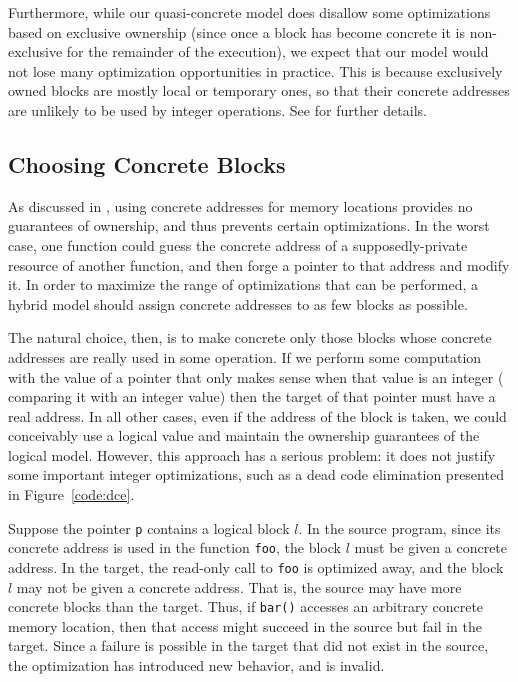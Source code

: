 Furthermore, while our quasi-concrete model does disallow some optimizations based on exclusive ownership (since once a block has become concrete it is non-exclusive for the remainder of the execution), we expect that our model would not lose many optimization
opportunities in practice. This is because exclusively owned blocks are mostly local or temporary ones,
  so that their concrete addresses are unlikely to be used by integer operations. See  for further details.

\subsection{Choosing Concrete Blocks}
\label{idea:cast}
As discussed in , using concrete addresses for memory locations provides no guarantees of ownership, and thus prevents certain optimizations. In the worst case, one function could guess the concrete address of a supposedly-private resource of another function, and then forge a pointer to that address and modify it. In order to maximize the range of optimizations that can be performed, a hybrid model should assign concrete addresses to as few blocks as possible.

The natural choice, then, is to make concrete only those blocks whose concrete addresses are really used in some operation. If we perform some computation with the value of a pointer that only makes sense when that value is an integer (\eg %
comparing it with an integer value) then the target of that pointer must have a real address. In all other cases, even if the address of the block is taken, we could conceivably use a logical value and maintain the ownership guarantees of the logical model. However, this approach has a serious problem: it does not justify some important integer optimizations, such as a dead code elimination presented in Figure~\ref{code:dce}.

Suppose the pointer \texttt{p} contains a logical block $l$. In the source program, since its concrete address is used in the function
\texttt{foo}, the block $l$ must be given a concrete address. In the target, the read-only call to \texttt{foo} is optimized away, and the block $l$ may not be given a concrete address. That is, the source may have more concrete blocks than the target. Thus, if \texttt{bar()} accesses an arbitrary concrete memory location, then that access might succeed in the source but fail in the target. Since a failure is possible in the target that did not exist in the source, the optimization has introduced new behavior, and is invalid.

